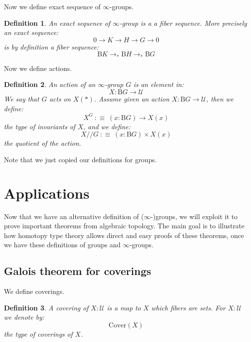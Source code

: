 \documentclass{article}
\newcommand{\se}[1]{\medbreak \medbreak \section{#1}}
\newcommand{\sse}[1]{\medbreak \subsection{#1}}
\newcommand{\U}{{\mathcal U}}
\renewcommand{\r}{\rightarrow}
\newcommand{\B}{\mathrm{B}}
\newtheorem{definition}{Definition}
\begin{document}
Now we define exact sequence of $\infty$-groups.

\begin{definition}
An exact sequence of $\infty$-group is a a fiber sequence. More precisely an exact sequence:
\[0\r K\r H\r G\r 0\]
is by definition a fiber sequence:
\[\B K\r_*\B H\r_*\B G\]
\end{definition}

Now we define actions.

\begin{definition}
An action of an $\infty$-group $G$ is an element in:
\[X : \B G \r \U\]
We say that $G$ acts on $X(*)$. Assume given an action $X:\B G \r \U$, then we define:
\[X^G \ :\equiv\ (x:\B G)\r X(x)\]
the type of invariants of $X$, and we define:
\[X//G \ :\equiv\ (x:\B G)\times X(x)\]
the quotient of the action. 
\end{definition}

Note that we just copied our definitions for groups.








\se{Applications}

Now that we have an alternative definition of ($\infty$-)groups, we will exploit it to prove important theorems from algebraic topology. The main goal is to illustrate how homotopy type theory allows direct and easy proofs of these theorems, once we have these definitions of groups and $\infty$-groups.



\sse{Galois theorem for coverings}

We define coverings.

\begin{definition}
A covering of $X:\U$ is a map to $X$ which fibers are sets. For $X:\U$ we denote by:
\[\mathrm{Cover}(X)\]
the type of coverings of $X$.
\end{definition} 
\end{document}
